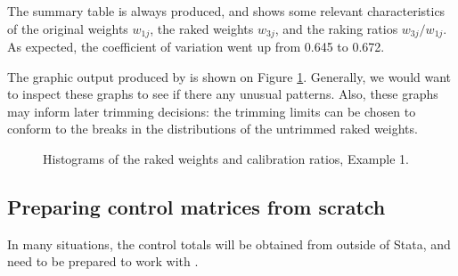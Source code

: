 \begin{stexample}[Example 1]
The summary table is always produced, and shows some relevant
characteristics of the original weights $w_{1j}$, the raked weights
$w_{3j}$, and the raking ratios $w_{3j}/w_{1j}$. As expected,
the coefficient of variation went up from 0.645 to 0.672.

The graphic output produced by  is shown on
Figure \ref{fig:example1}. Generally, we would want to inspect these
graphs to see if there any unusual patterns. Also, these graphs
may inform later trimming decisions: the trimming limits can be
chosen to conform to the breaks in the distributions of
the untrimmed raked weights.

\begin{figure}[h!]
\begin{center}
\end{center}
\caption{Histograms of the raked weights and calibration ratios, Example 1.}
\label{fig:example1}
\end{figure}

\end{stexample}

\subsection{Preparing control matrices from scratch}

In many situations, the control totals will be obtained
from outside of Stata, and need to be prepared to work
with .

